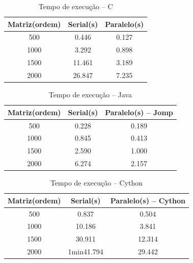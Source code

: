 \documentclass[a4paper,12pt]{article}
\begin{document}
\begin{table}[H]
  \centering
  \caption{Tempo de execução -- C}
  \begin{tabular}{ccc}
    \hline
    Matriz(ordem) & Serial(s) & Paralelo(s)\\
    \hline
    \hline
    500 & 0.446 & 0.127\\
    1000 & 3.292 & 0.898\\
    1500 & 11.461 & 3.189\\
    2000 & 26.847 & 7.235\\
    \hline
  \end{tabular}
  \label{tab:timec}
\end{table}




\begin{table}[H]
  \centering
  \caption{Tempo de execução -- Java}
  \begin{tabular}{ccc}
    \hline
    Matriz(ordem) & Serial(s) & Paralelo(s) -- Jomp\\
    \hline
    \hline
    500 & 0.228 & 0.189\\
    1000 & 0.845 & 0.413\\
    1500 & 2.590 & 1.000\\
    2000 & 6.274 & 2.157\\
    \hline
  \end{tabular}
  \label{tab:timeJava}
\end{table}



\begin{table}[H]
  \centering
  \caption{Tempo de execução -- Cython}
  \begin{tabular}{ccc}
    \hline
    Matriz(ordem) & Serial(s) & Paralelo(s) -- Cython \\
    \hline
    \hline
    500 & 0.837 &  0.504 \\
    1000 & 10.186 & 3.841\\
    1500 & 30.911 & 12.314\\
    2000 & 1min41.794 & 29.442\\
    \hline
  \end{tabular}
  \label{tab:timePy1}
\end{table}
\end{document}
